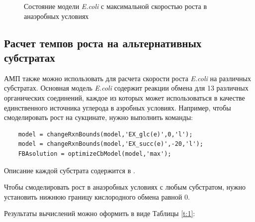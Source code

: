 \documentclass[a4paper, 12pt]{article}
\begin{document}
\begin{figure}[H]
    \caption{Состояние модели \textit{E.coli} с максимальной скоростью роста в анаэробных условиях}
    \label{fig:gr_anaer}
\end{figure}

\subsection{Расчет темпов роста на альтернативных субстратах}

АМП также можно использовать для расчета скорости роста \textit{E.coli} на различных субстратах. Основная модель \textit{E.coli} содержит реакции обмена для 13 различных органических соединений, каждое из которых может использоваться в качестве единственного источника углерода в аэробных условиях. Например, чтобы смоделировать рост на сукцинате, нужно выполнить команды:
\begin{lstlisting}
    model = changeRxnBounds(model,'EX_glc(e)',0,'l');
    model = changeRxnBounds(model,'EX_succ(e)',-20,'l');
    FBAsolution = optimizeCbModel(model,'max');
\end{lstlisting}

Описание каждой субстрата содержится в . 

Чтобы смоделировать рост в анаэробных условиях с любым субстратом, нужно установить нижнюю границу кислородного обмена равной 0.

Результаты вычислений можно оформить в виде Таблицы \ref{t:1}:
\end{document}
